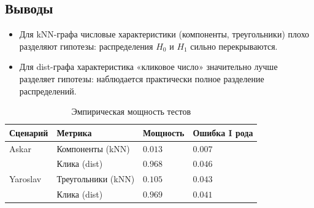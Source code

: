 \documentclass[a4paper,12pt]{article}
\begin{document}
\subsection*{Выводы }
\begin{itemize}
    \item Для kNN-графа числовые характеристики (компоненты, треугольники) плохо разделяют гипотезы: распределения $H_0$ и $H_1$ сильно перекрываются.
    \item Для dist-графа характеристика «кликовое число» значительно лучше разделяет гипотезы: наблюдается практически полное разделение распределений.
\end{itemize}

\begin{table}[H]
    \centering
    \caption{Эмпирическая мощность тестов }
    \label{tab:power}
    \begin{tabular}{@{}llll@{}}
        \toprule
        Сценарий & Метрика & Мощность & Ошибка I рода \\
        \midrule
        Askar & Компоненты (kNN) & $0.013$ & $0.007$ \\
        & Клика (dist) & $0.968$ & $0.046$ \\
        Yaroslav & Треугольники (kNN) & $0.105$ & $0.043$ \\
        & Клика (dist) & $0.969$ & $0.041$ \\
        \bottomrule
    \end{tabular}
\end{table}

\end{document}
